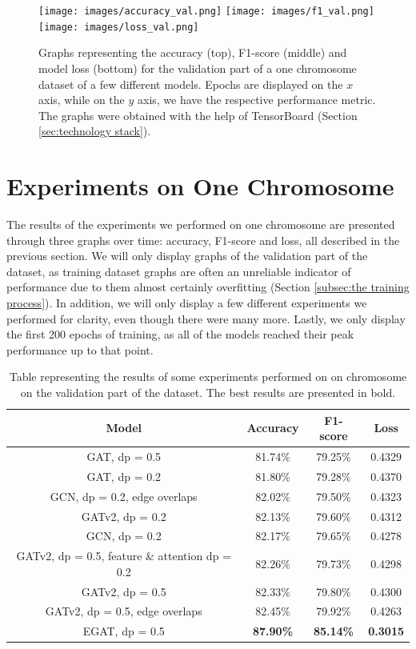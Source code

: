 \documentclass[times, utf8, diplomski, english]{fer_eng}
\begin{document}
\begin{figure}[h]
	\centering
	\texttt{[image: images/accuracy\_val.png]}
	\texttt{[image: images/f1\_val.png]}
	\texttt{[image: images/loss\_val.png]}
	\caption[Accuracy, f1-score and loss graph for one chromosome]{Graphs representing the accuracy (top), F1-score (middle) and model loss (bottom) for the validation part of a one chromosome dataset of a few different models. Epochs are displayed on the $x$ axis, while on the $y$ axis, we have the respective performance metric. The graphs were obtained with the help of TensorBoard (Section \ref{sec:technology stack}).}
	\label{fig:accuracy and f1 graph}
\end{figure}

\section{Experiments on One Chromosome}
\label{sec:experiments on one chromosome}

The results of the experiments we performed on one chromosome are presented through three graphs over time: accuracy, F1-score and loss, all described in the previous section. We will only display graphs of the validation part of the dataset, as training dataset graphs are often an unreliable indicator of performance due to them almost certainly overfitting (Section \ref{subsec:the training process}). In addition, we will only display a few different experiments we performed for clarity, even though there were many more. Lastly, we only display the first 200 epochs of training, as all of the models reached their peak performance up to that point.

\begin{table}
	\centering
	\begin{tabular}{ |c|c|c|c| }
		\hline	
		Model & Accuracy & F1-score & Loss \\
		\hline\hline
		GAT, dp = 0.5 & 81.74\% & 79.25\% & 0.4329 \\
		\hline
		GAT, dp = 0.2 & 81.80\% & 79.28\% & 0.4370 \\
		\hline
		GCN, dp = 0.2, edge overlaps & 82.02\% & 79.50\% & 0.4323 \\
		\hline
		GATv2, dp = 0.2 & 82.13\% & 79.60\% & 0.4312 \\
		\hline
		GCN, dp = 0.2 & 82.17\% & 79.65\% & 0.4278 \\
		\hline
		GATv2, dp = 0.5, feature \& attention dp = 0.2 & 82.26\% & 79.73\% & 0.4298 \\
		\hline
		GATv2, dp = 0.5 & 82.33\% & 79.80\% & 0.4300 \\
		\hline
		GATv2, dp = 0.5, edge overlaps & 82.45\% & 79.92\% & 0.4263 \\
		\hline
		EGAT, dp = 0.5 & \textbf{87.90\%} & \textbf{85.14\%} & \textbf{0.3015} \\
		\hline
	\end{tabular}
	\caption{Table representing the results of some experiments performed on on chromosome on the validation part of the dataset. The best results are presented in bold.}
	\label{tab:results}
\end{table}	
\end{document}

